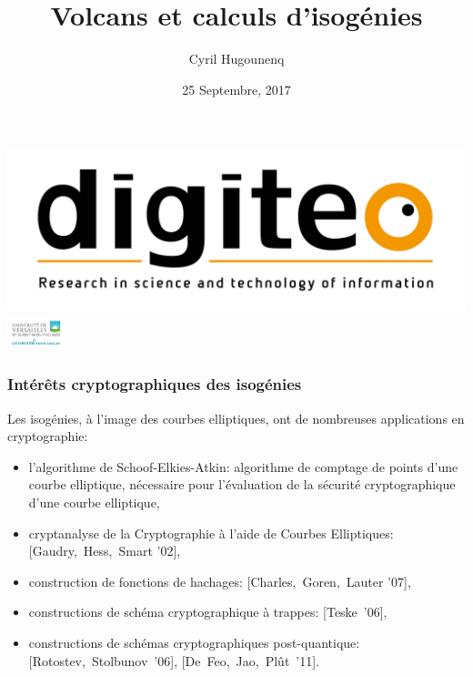 \documentclass[10pt,a4paper]{beamer}
\theoremstyle{plain}
\theoremstyle{definition}
\theoremstyle{definition}
\theoremstyle{definition}
\theoremstyle{definition}
\theoremstyle{remark}
\theoremstyle{remark}
\newcommand{\bluebox}[2]{
\setbeamercolor{upperblue}{fg=white,bg=blue}
\setbeamercolor{lowercol}{fg=black,bg=pacificcream}

\begin{beamerboxesrounded}[upper=upperblue,lower=lowercol,shadow=true]{
#1 }  #2
\end{beamerboxesrounded} }
\begin{document}
\author{
Cyril Hugounenq
}
\title[Volcans et calculs d'isogénies]{
Volcans et calculs d'isogénies}
\date{25 Septembre, 2017}


\begin{frame}
\titlepage

\hfill
\includegraphics[scale=0.1]{Images/digiteo.jpg}\hfill
\includegraphics[height=10mm]{Images/uvsq-logo-cmjn.jpg}
\end{frame}

\begin{frame}
\frametitle{Intérêts cryptographiques des isogénies}

Les isogénies, à l'image des courbes elliptiques, ont de nombreuses 
applications en cryptographie: 
\begin{itemize}
\item l'algorithme de Schoof-Elkies-Atkin: algorithme de comptage de points
d'une courbe elliptique, nécessaire pour l'évaluation de la sécurité 
cryptographique d'une courbe elliptique,
\pause
\item cryptanalyse de la Cryptographie à l'aide de Courbes Elliptiques: [Gaudry,~Hess,~Smart '02],
\pause
\item construction de fonctions de hachages: [Charles,~Goren,~Lauter '07],
\pause
\item constructions de schéma cryptographique à trappes: [Teske~'06],
\pause
\item constructions de schémas cryptographiques post-quantique: [Rotostev,~Stolbunov~'06], [De~Feo,~Jao,~Pl\^ut~'11].
\end{itemize}
\end{frame}
\end{document}
